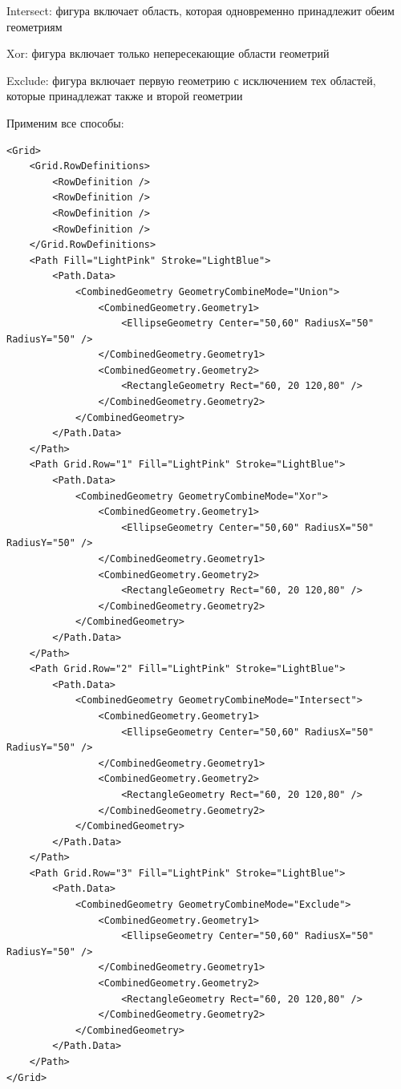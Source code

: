 Intersect: фигура включает область, которая одновременно принадлежит обеим геометриям

Xor: фигура включает только непересекающие области геометрий

Exclude: фигура включает первую геометрию с исключением тех областей, которые принадлежат также и второй геометрии

Применим все способы:

\begin{verbatim}
<Grid>
    <Grid.RowDefinitions>
        <RowDefinition />
        <RowDefinition />
        <RowDefinition />
        <RowDefinition />
    </Grid.RowDefinitions>
    <Path Fill="LightPink" Stroke="LightBlue">
        <Path.Data>
            <CombinedGeometry GeometryCombineMode="Union">
                <CombinedGeometry.Geometry1>
                    <EllipseGeometry Center="50,60" RadiusX="50" RadiusY="50" />
                </CombinedGeometry.Geometry1>
                <CombinedGeometry.Geometry2>
                    <RectangleGeometry Rect="60, 20 120,80" />
                </CombinedGeometry.Geometry2>
            </CombinedGeometry>
        </Path.Data>
    </Path>
    <Path Grid.Row="1" Fill="LightPink" Stroke="LightBlue">
        <Path.Data>
            <CombinedGeometry GeometryCombineMode="Xor">
                <CombinedGeometry.Geometry1>
                    <EllipseGeometry Center="50,60" RadiusX="50" RadiusY="50" />
                </CombinedGeometry.Geometry1>
                <CombinedGeometry.Geometry2>
                    <RectangleGeometry Rect="60, 20 120,80" />
                </CombinedGeometry.Geometry2>
            </CombinedGeometry>
        </Path.Data>
    </Path>
    <Path Grid.Row="2" Fill="LightPink" Stroke="LightBlue">
        <Path.Data>
            <CombinedGeometry GeometryCombineMode="Intersect">
                <CombinedGeometry.Geometry1>
                    <EllipseGeometry Center="50,60" RadiusX="50" RadiusY="50" />
                </CombinedGeometry.Geometry1>
                <CombinedGeometry.Geometry2>
                    <RectangleGeometry Rect="60, 20 120,80" />
                </CombinedGeometry.Geometry2>
            </CombinedGeometry>
        </Path.Data>
    </Path>
    <Path Grid.Row="3" Fill="LightPink" Stroke="LightBlue">
        <Path.Data>
            <CombinedGeometry GeometryCombineMode="Exclude">
                <CombinedGeometry.Geometry1>
                    <EllipseGeometry Center="50,60" RadiusX="50" RadiusY="50" />
                </CombinedGeometry.Geometry1>
                <CombinedGeometry.Geometry2>
                    <RectangleGeometry Rect="60, 20 120,80" />
                </CombinedGeometry.Geometry2>
            </CombinedGeometry>
        </Path.Data>
    </Path>
</Grid>
\end{verbatim}

